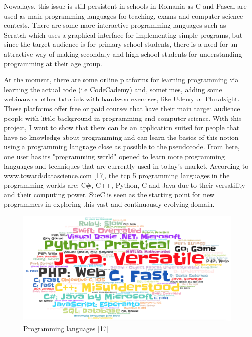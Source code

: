 \documentclass[12pt,a4paper,twoside]{report}
\begin{document}
	Nowadays, this issue is still persistent in schools in Romania as C and Pascal are used as main programming languages for teaching, exams and computer science contests. There are some more interactive programming languages such as Scratch which uses a graphical interface for implementing simple programs, but since the target audience is for primary school students, there is a need for an attractive way of making secondary and high school students for understanding programming at their age group. 
	
	At the moment, there are some online platforms for learning programming via learning the actual code (i.e CodeCademy) and, sometimes, adding some webinars or other tutorials with hands-on exercises, like Udemy or Pluralsight. These platforms offer free or paid courses that have their main target audience people with little background in programming and computer science. With this project, I want to show that there can be an application suited for people that have no knowledge about programming and can learn the basics of this notion using a programming language close as possible to the pseudocode. From here, one user has its "programming world" opened to learn more programming languages and techniques that are currently used in today's market. According to www.towardsdatascience.com [17], the top 5 programming languages in the programming worlds are: C\#, C++, Python, C and Java due to their versatility and their computing power. SueC is seen as the starting point for new programmers in exploring this vast and continuously evolving domain. 
	
	
	\begin{figure}[H]
		\centering
		\includegraphics[scale=0.22]{img/diags/proglang.png}
		\caption{Programming languages [17]}
	\end{figure}
	
	
	
\end{document}

